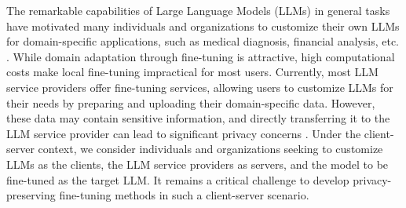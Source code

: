 The remarkable capabilities of Large Language Models (LLMs) in general tasks have motivated many individuals and organizations to customize their own LLMs for domain-specific applications, such as medical diagnosis, financial analysis, etc. \citep{wu2023bloomberggpt,chen2023meditron}. 
While domain adaptation through fine-tuning is attractive, high computational costs make local fine-tuning impractical for most users. 
Currently, most LLM service providers \citep{achiam2023gpt,YangQwen224,Doubao2024} offer fine-tuning services, allowing users to customize LLMs for their needs by preparing and uploading their domain-specific data. 
However, these data may contain sensitive information, and directly transferring it to the LLM service provider can lead to significant privacy concerns \citep{zeng2024privacyrestore, Sahar2023Not}. 
Under the client-server context, we consider individuals and organizations seeking to customize LLMs as the clients, the LLM service providers as servers, and the model to be fine-tuned as the target LLM.
It remains a critical challenge to develop privacy-preserving fine-tuning methods in such a client-server scenario.






